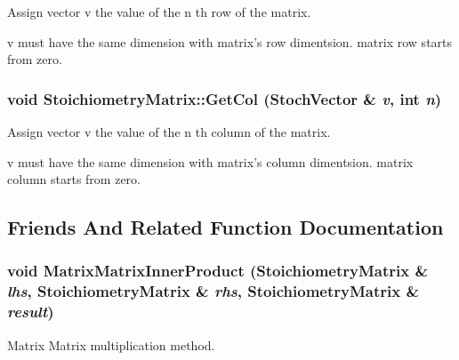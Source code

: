 Assign vector v the value of the n th row of the matrix. 

v must have the same dimension with matrix's row dimentsion. matrix row starts from zero. \hypertarget{class_stoichiometry_matrix_47b1e50dfcd12d5aa211d98fe288018a}{
\subsubsection{\setlength{\rightskip}{0pt plus 5cm}void StoichiometryMatrix::GetCol ({\bf StochVector} \& {\em v}, \/  int {\em n})}}
\label{class_stoichiometry_matrix_47b1e50dfcd12d5aa211d98fe288018a}


Assign vector v the value of the n th column of the matrix. 

v must have the same dimension with matrix's column dimentsion. matrix column starts from zero. 

\subsection{Friends And Related Function Documentation}
\hypertarget{class_stoichiometry_matrix_10424efd5c6593638e200178321d9cd9}{
\subsubsection{\setlength{\rightskip}{0pt plus 5cm}void MatrixMatrixInnerProduct ({\bf StoichiometryMatrix} \& {\em lhs}, \/  {\bf StoichiometryMatrix} \& {\em rhs}, \/  {\bf StoichiometryMatrix} \& {\em result})}}
\label{class_stoichiometry_matrix_10424efd5c6593638e200178321d9cd9}


Matrix Matrix multiplication method. 

